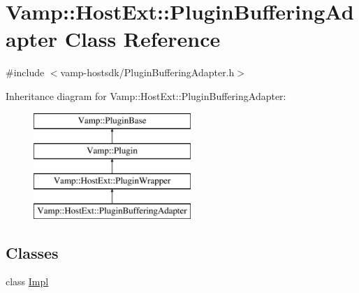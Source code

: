 \hypertarget{class_vamp_1_1_host_ext_1_1_plugin_buffering_adapter}{}\section{Vamp\+:\+:Host\+Ext\+:\+:Plugin\+Buffering\+Adapter Class Reference}
\label{class_vamp_1_1_host_ext_1_1_plugin_buffering_adapter}


{\ttfamily \#include $<$vamp-\/hostsdk/\+Plugin\+Buffering\+Adapter.\+h$>$}

Inheritance diagram for Vamp\+:\+:Host\+Ext\+:\+:Plugin\+Buffering\+Adapter\+:\begin{figure}[H]
\begin{center}
\leavevmode
\includegraphics[height=4.000000cm]{class_vamp_1_1_host_ext_1_1_plugin_buffering_adapter}
\end{center}
\end{figure}
\subsection*{Classes}
\begin{DoxyCompactItemize}
\item 
class \hyperlink{class_vamp_1_1_host_ext_1_1_plugin_buffering_adapter_1_1_impl}{Impl}
\end{DoxyCompactItemize}
